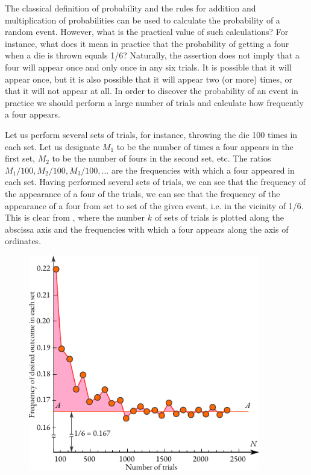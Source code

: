  The classical
definition of probability and the rules for addition and
multiplication of probabilities can be used to calculate the
probability of a random event. However, what is the practical value of
such calculations? For instance, what does it mean in practice that
the probability of getting a four when a die is thrown equals 1/6? Naturally, the assertion does not imply that a four will appear once and only once in any six trials. It is possible that it will appear once, but it is also possible that it will appear two (or more) times, or that it will not appear at all. In order to discover the probability of an event in practice we should perform a large number of trials and calculate how frequently a four appears.


Let us perform several sets of trials, for instance, throwing the die
100 times in each set. Let us designate $M_{1}$ to be the number of
times a four appears in the first set, $M_{2}$ to be the
number of fours in the second set, etc. The ratios
$M_{1}/100, M_{2}/100, M_{3}/100, \ldots{} $ are the frequencies with
which a four appeared in each set. Having performed several sets of
trials, we can see that the frequency of the appearance of a four
 of the trials, we can see that the frequency of the
appearance of a four  from set to set  of the given event,
i.e. in the vicinity of 1/6. This is clear from , where the number $k$ of sets of trials is plotted along the abscissa axis and the frequencies with which a four appears along
the axis of ordinates. 

\begin{figure}%
 \centering
 \includegraphics[width=0.9\textwidth]{figures/die-graph2.pdf}
 \end{figure}
 
